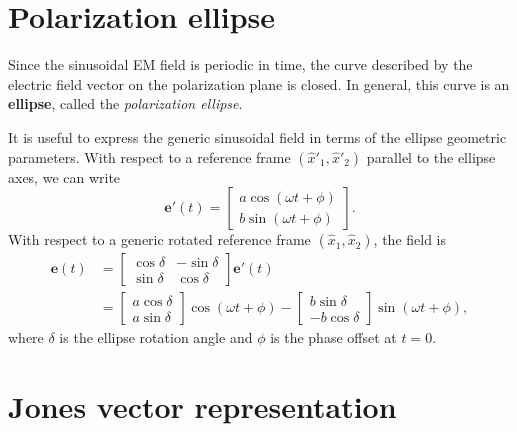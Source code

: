 

\section{Polarization ellipse}

Since the sinusoidal EM field is periodic in time,  
the curve described by the electric field vector on the polarization plane is closed.  
In general, this curve is an \textbf{ellipse}, called the \emph{polarization ellipse}.

It is useful to express the generic sinusoidal field in terms of the ellipse geometric parameters.
With respect to a reference frame $(\hat{x}'_1, \hat{x}'_2)$ parallel to the ellipse axes, we can write
\begin{equation}
    \mathbf{e}'(t)
    =
    \begin{bmatrix}
        a\cos(\omega t + \phi)\\[4pt]
        b\sin(\omega t + \phi)
    \end{bmatrix}.
\end{equation}
With respect to a generic rotated reference frame $(\hat{x}_1,\hat{x}_2)$, the field is
\begin{align}
    \mathbf{e}(t)
    &= 
    \begin{bmatrix}
        \cos\delta & -\sin\delta\\
        \sin\delta & \cos\delta
    \end{bmatrix}
    \mathbf{e}'(t)\\[4pt]
    &=
    \begin{bmatrix}
        a\cos\delta\\ a\sin\delta
    \end{bmatrix}\!\cos(\omega t + \phi)
    -
    \begin{bmatrix}
        b\sin\delta\\ -b\cos\delta
    \end{bmatrix}\!\sin(\omega t + \phi),
\end{align}
where $\delta$ is the ellipse rotation angle and $\phi$ is the phase offset at $t=0$.

\section{Jones vector representation}

